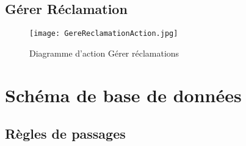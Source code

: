 \subsection{Gérer Réclamation}

\begin{figure}[H]
	\centering
	\texttt{[image: GereReclamationAction.jpg]}
	\caption{Diagramme d'action Gérer réclamations}
	\label{fig:action gerer reclamation}
\end{figure}

\section{Schéma de base de données}
\subsection{Règles de passages}
